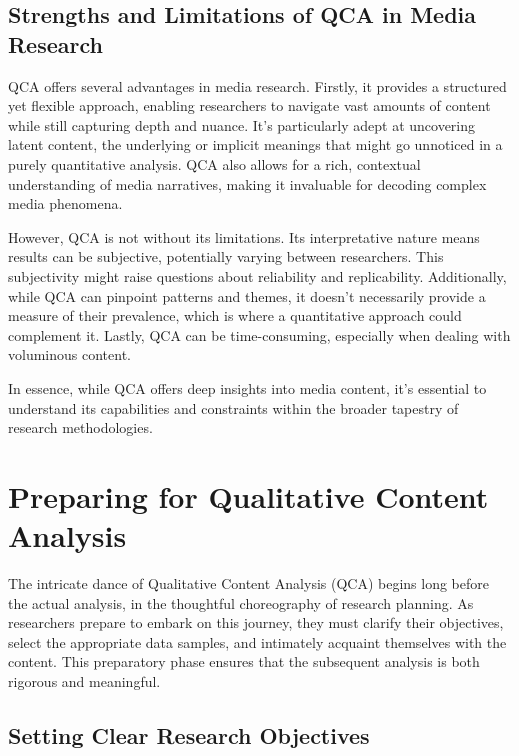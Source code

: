 \documentclass[
  b5paper]{book}
\begin{document}
\hypertarget{strengths-and-limitations-of-qca-in-media-research}{%
\subsection*{Strengths and Limitations of QCA in Media Research}\label{strengths-and-limitations-of-qca-in-media-research}}

QCA offers several advantages in media research. Firstly, it provides a structured yet flexible approach, enabling researchers to navigate vast amounts of content while still capturing depth and nuance. It's particularly adept at uncovering latent content, the underlying or implicit meanings that might go unnoticed in a purely quantitative analysis. QCA also allows for a rich, contextual understanding of media narratives, making it invaluable for decoding complex media phenomena.

However, QCA is not without its limitations. Its interpretative nature means results can be subjective, potentially varying between researchers. This subjectivity might raise questions about reliability and replicability. Additionally, while QCA can pinpoint patterns and themes, it doesn't necessarily provide a measure of their prevalence, which is where a quantitative approach could complement it. Lastly, QCA can be time-consuming, especially when dealing with voluminous content.

In essence, while QCA offers deep insights into media content, it's essential to understand its capabilities and constraints within the broader tapestry of research methodologies.

\hypertarget{preparing-for-qualitative-content-analysis}{%
\section{Preparing for Qualitative Content Analysis}\label{preparing-for-qualitative-content-analysis}}

The intricate dance of Qualitative Content Analysis (QCA) begins long before the actual analysis, in the thoughtful choreography of research planning. As researchers prepare to embark on this journey, they must clarify their objectives, select the appropriate data samples, and intimately acquaint themselves with the content. This preparatory phase ensures that the subsequent analysis is both rigorous and meaningful.

\hypertarget{setting-clear-research-objectives}{%
\subsection*{Setting Clear Research Objectives}\label{setting-clear-research-objectives}}
\end{document}
